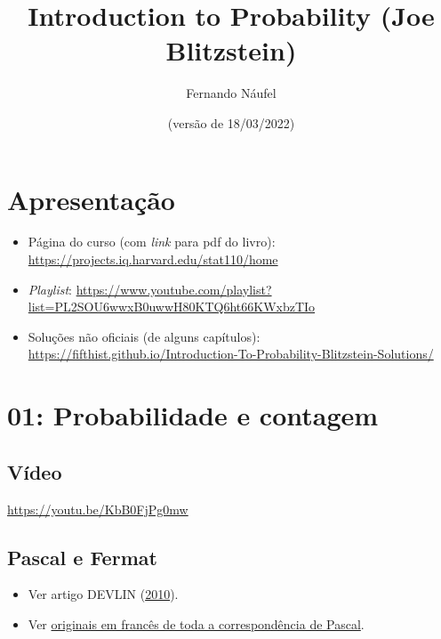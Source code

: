 \documentclass[
  11pt]{report}
\title{Introduction to Probability (Joe Blitzstein)}
\author{Fernando Náufel}
\date{(versão de 18/03/2022)}
\begin{document}
\maketitle

{
\setcounter{tocdepth}{2}
\tableofcontents
}
\hypertarget{apresentauxe7uxe3o}{%
\chapter*{Apresentação}\label{apresentauxe7uxe3o}}

\begin{itemize}
\item
  Página do curso (com \emph{link} para pdf do livro): \url{https://projects.iq.harvard.edu/stat110/home}
\item
  \emph{Playlist}: \url{https://www.youtube.com/playlist?list=PL2SOU6wwxB0uwwH80KTQ6ht66KWxbzTIo}
\item
  Soluções não oficiais (de alguns capítulos): \url{https://fifthist.github.io/Introduction-To-Probability-Blitzstein-Solutions/}
\end{itemize}

\hypertarget{probabilidade-e-contagem}{%
\chapter*{01: Probabilidade e contagem}\label{probabilidade-e-contagem}}

\hypertarget{vuxeddeo}{%
\section*{Vídeo}\label{vuxeddeo}}

\begin{center} \url{https://youtu.be/KbB0FjPg0mw} \end{center}

\hypertarget{pascal-e-fermat}{%
\section*{Pascal e Fermat}\label{pascal-e-fermat}}

\begin{itemize}
\item
  Ver artigo DEVLIN (\protect\hyperlink{ref-devlin-2010-pascal-fermat}{2010}).
\item
  Ver \href{https://gallica.bnf.fr/ark:/12148/bpt6k69975r.image.r=Blaise+Pascal.f233.langFR}{originais em francês de toda a correspondência de Pascal}.
\end{itemize}
\end{document}
